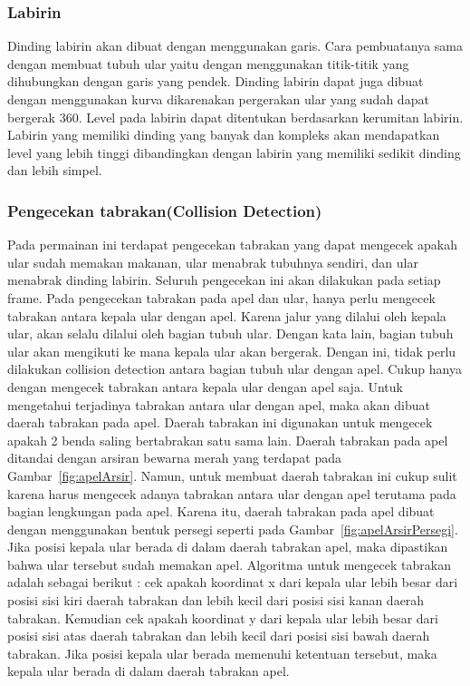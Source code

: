 \subsubsection{Labirin}
Dinding labirin akan dibuat dengan menggunakan garis. Cara pembuatanya sama dengan membuat tubuh ular yaitu dengan menggunakan titik-titik yang dihubungkan dengan garis yang pendek. Dinding labirin dapat juga dibuat dengan menggunakan kurva dikarenakan pergerakan ular yang sudah dapat bergerak 360. Level pada labirin dapat ditentukan berdasarkan kerumitan labirin. Labirin yang memiliki dinding yang banyak dan kompleks akan mendapatkan level yang lebih tinggi dibandingkan dengan labirin yang memiliki sedikit dinding dan lebih simpel. 

\subsubsection{Pengecekan tabrakan(Collision Detection)}
Pada permainan ini terdapat pengecekan tabrakan yang dapat mengecek apakah ular sudah memakan makanan, ular menabrak tubuhnya sendiri, dan ular menabrak dinding labirin. Seluruh pengecekan ini akan dilakukan pada setiap frame. Pada pengecekan tabrakan pada apel dan ular, hanya perlu mengecek tabrakan antara kepala ular dengan apel. Karena jalur yang dilalui oleh kepala ular, akan selalu dilalui oleh bagian tubuh ular. Dengan kata lain, bagian tubuh ular akan mengikuti ke mana kepala ular akan bergerak. Dengan ini, tidak perlu dilakukan collision detection antara bagian tubuh ular dengan apel. Cukup hanya dengan mengecek tabrakan antara kepala ular dengan apel saja. Untuk mengetahui terjadinya tabrakan antara ular dengan apel, maka akan dibuat daerah tabrakan pada apel. Daerah tabrakan ini digunakan untuk mengecek apakah 2 benda saling bertabrakan satu sama lain. Daerah tabrakan pada apel ditandai dengan arsiran bewarna merah yang terdapat pada Gambar~\ref{fig:apelArsir}. Namun, untuk membuat daerah tabrakan ini cukup sulit karena harus mengecek adanya tabrakan antara ular dengan apel terutama pada bagian lengkungan pada apel. Karena itu, daerah tabrakan pada apel dibuat dengan menggunakan bentuk persegi seperti pada Gambar~\ref{fig:apelArsirPersegi}. Jika posisi kepala ular berada di dalam daerah tabrakan apel, maka dipastikan bahwa ular tersebut sudah memakan apel. Algoritma untuk mengecek tabrakan adalah sebagai berikut : cek apakah koordinat x dari kepala ular lebih besar dari posisi sisi kiri daerah tabrakan dan lebih kecil dari posisi sisi kanan daerah tabrakan. Kemudian cek apakah koordinat y dari kepala ular lebih besar dari posisi sisi atas daerah tabrakan dan lebih kecil dari posisi sisi bawah daerah tabrakan. Jika posisi kepala ular berada memenuhi ketentuan tersebut, maka kepala ular berada di dalam daerah tabrakan apel.\\

